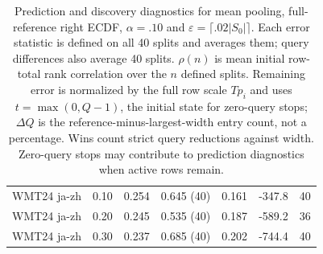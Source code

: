 \begin{table}[t]
\begin{tabular}{lrrrrrr}
WMT24 ja-zh & 0.10 & 0.254 & 0.645 (40) & 0.161 & -347.8 & 40 \\
WMT24 ja-zh & 0.20 & 0.245 & 0.535 (40) & 0.187 & -589.2 & 36 \\
WMT24 ja-zh & 0.30 & 0.237 & 0.685 (40) & 0.202 & -744.4 & 40 \\
\bottomrule
\end{tabular}
\caption{Prediction and discovery diagnostics for mean pooling, full-reference right ECDF, $\alpha=.10$ and $\varepsilon=\lceil.02|S_0|\rceil$. Each error statistic is defined on all 40 splits and averages them; query differences also average 40 splits. $\rho(n)$ is mean initial row-total rank correlation over the $n$ defined splits. Remaining error is normalized by the full row scale $Tp_i$ and uses $t=\max(0,Q-1)$, the initial state for zero-query stops; $\Delta Q$ is the reference-minus-largest-width entry count, not a percentage. Wins count strict query reductions against width. Zero-query stops may contribute to prediction diagnostics when active rows remain.}
\label{tab:acquisition-mean}
\end{table}
